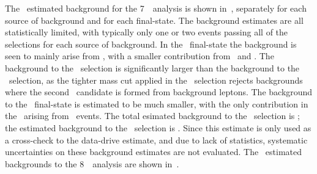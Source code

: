 The \mc\ estimated background for the 7~\tev\ analysis is shown
in~, separately for each source of background and for each final-state. The
background estimates are all statistically limited, with typically only one or
two events passing all of the selections for each source of background. In the \eeee\ final-state the
background is seen to mainly arise from \ZX, with a smaller contribution from
\WZ\ and \WW. The background to the \ZZs\ selection is significantly larger than
the background to the \ZZ\ selection, as the tighter mass cut applied in the
\ZZ\ selection rejects backgrounds where the second \Z\ candidate is formed from
background leptons. The background to the \mmmm\ final-state is estimated to be much smaller, with the only contribution in the \mc\ arising
from \WZ\ events. The total esimated background to the \ZZs\ selection is
; the estimated background to the \ZZ\ selection
is . Since this estimate is only used as a
cross-check to the data-drive estimate, and due to lack of statistics,
systematic uncertainties on these background estimates are not evaluated.
The \mc\ estimated backgrounds to the 8~\tev\ analysis are shown
in~. 


